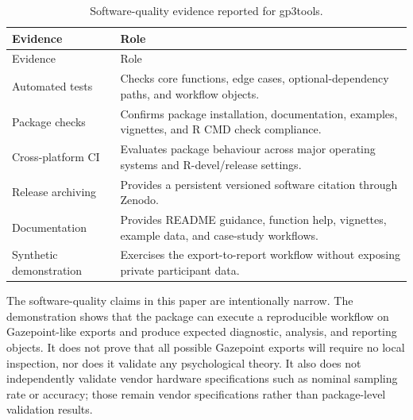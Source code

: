 \documentclass[
]{article}
\begin{document}
\begin{longtable}[]{@{}
  >{\raggedright\arraybackslash}p{}
  >{\raggedright\arraybackslash}p{}@{}}
\caption{Software-quality evidence reported for
gp3tools.}\tabularnewline
\toprule\noalign{}
\begin{minipage}[b]{\linewidth}\raggedright
Evidence
\end{minipage} & \begin{minipage}[b]{\linewidth}\raggedright
Role
\end{minipage} \\
\midrule\noalign{}
\endfirsthead
\toprule\noalign{}
\begin{minipage}[b]{\linewidth}\raggedright
Evidence
\end{minipage} & \begin{minipage}[b]{\linewidth}\raggedright
Role
\end{minipage} \\
\midrule\noalign{}
\endhead
\bottomrule\noalign{}
\endlastfoot
Automated tests & Checks core functions, edge cases, optional-dependency
paths, and workflow objects. \\
Package checks & Confirms package installation, documentation, examples,
vignettes, and R CMD check compliance. \\
Cross-platform CI & Evaluates package behaviour across major operating
systems and R-devel/release settings. \\
Release archiving & Provides a persistent versioned software citation
through Zenodo. \\
Documentation & Provides README guidance, function help, vignettes,
example data, and case-study workflows. \\
Synthetic demonstration & Exercises the export-to-report workflow
without exposing private participant data. \\
\end{longtable}

The software-quality claims in this paper are intentionally narrow. The
demonstration shows that the package can execute a reproducible workflow
on Gazepoint-like exports and produce expected diagnostic, analysis, and
reporting objects. It does not prove that all possible Gazepoint exports
will require no local inspection, nor does it validate any psychological
theory. It also does not independently validate vendor hardware
specifications such as nominal sampling rate or accuracy; those remain
vendor specifications rather than package-level validation results.
\end{document}
